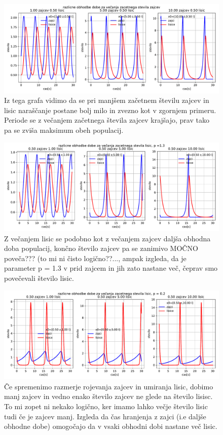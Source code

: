\documentclass[11pt, a4paper]{article}
\begin{document}
\begin{figure}[htb!]
  \centering
  \includegraphics[width=18cm]{zajci_razlicni_zacetni_vecanje_zajci.pdf}
  \caption{Iz tega grafa vidimo da se pri manjšem začetnem številu zajcev in lisic naraščanje postane bolj milo in zvezno kot v zgornjem primeru. Periode se z večanjem začetnega števila zajcev krajšajo, prav tako pa se zviša maksimum obeh populacij.}
\end{figure}
\begin{figure}[htb!]
  \centering
  \includegraphics[width=18cm]{zajci_razlicni_zacetni_vecanje_lisic.pdf}
  \caption{Z večanjem lisic se podobno kot z večanjem zajcev daljša obhodna doba populacij, končno število zajcev pa se zanimivo MOČNO poveča??? (to mi ni čisto logično??..., ampak izgleda, da je parameter p = 1.3 v prid zajcem in jih zato nastane več, čeprav smo povečevali število lisic.}
\end{figure}


\begin{figure}[htb!]
  \centering
  \includegraphics[width=18cm]{zajci_razlicni_zacetni_vecanje_lisic_bolj_realno.pdf}
  \caption{Če spremenimo razmerje rojevanja zajcev in umiranja lisic, dobimo manj zajcev in vedno enako število zajcev ne glede na število lisisc. To mi zopet ni nekako logično, ker imamo lahko večje število lisic tudi če je zajcev manj. Izgleda da čas hranjenja z zajci (i.e daljše obhodne dobe) omogočajo da v vsaki obhodni dobi nastane več lisic.}
\end{figure}
\end{document}
